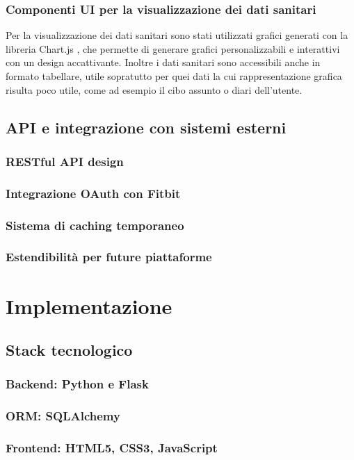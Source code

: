 \documentclass[12pt,a4paper,oneside]{report}
\begin{document}
\subsection{Componenti UI per la visualizzazione dei dati sanitari}
Per la visualizzazione dei dati sanitari sono stati utilizzati grafici generati con la libreria Chart.js \cite{chartjs}, che permette di generare grafici personalizzabili e interattivi con un design accattivante.
Inoltre i dati sanitari sono accessibili anche in formato tabellare, utile sopratutto per quei dati la cui rappresentazione grafica risulta poco utile, come ad esempio il cibo assunto o diari dell'utente.
\section{API e integrazione con sistemi esterni}
\subsection{RESTful API design}
\subsection{Integrazione OAuth con Fitbit}
\subsection{Sistema di caching temporaneo}
\subsection{Estendibilità per future piattaforme}





\chapter{Implementazione}
\section{Stack tecnologico}
\subsection{Backend: Python e Flask}
\subsection{ORM: SQLAlchemy}
\subsection{Frontend: HTML5, CSS3, JavaScript}
\end{document}
